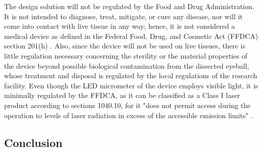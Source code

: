 \documentclass{article}
\begin{document}
The design solution will not be regulated by the Food and Drug Administration. It is not intended
to diagnose, treat, mitigate, or cure any disease, nor will it come into
contact with live tissue in any way; hence, it is not considered a medical device as defined in the Federal Food, Drug,
and Cosmetic Act (FFDCA) section 201(h) \cite{fdaguidelines}. Also, since the device will not be used
on live tissues, there is little regulation necessary concerning the sterility
or the material properties of the device beyond possible biological contamination from the dissected eyeball, whose treatment and disposal is regulated by the local regulations of the research facility.  Even though the LED micrometer of the device employs visible light, it is minimally regulated by the FFDCA, as it can be classified as a Class I laser product according to sections 1040.10, for it "does not permit access during the operation to levels of laser radiation in excess of the accessible emission limits" \cite{fdaguidelines}. 
 
 
 
\subsection{Conclusion}
\label{sec:Conclusion}
 
\newpage
{}


 
\end{document}
